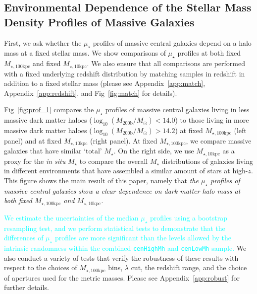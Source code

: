\documentclass[a4paper,fleqn,usenatbib]{mnras}
\def\rbcg{\texttt{cenHighMh}}
\def\nbcg{\texttt{cenLowMh}}
\def\mstar{{$M_{\star}$}}
\def\logmh{{$\log_{10} (M_{\mathrm{200b}}/M_{\odot})$}}
\def\minn{{$M_{\star,10\mathrm{kpc}}$}}
\def\mtot{{$M_{\star,100\mathrm{kpc}}$}}
\def\mden{{$\mu_{\star}$}}
\newcommand{\song}[1]{\textcolor{cyan}{#1}}
\begin{document}
\subsection{Environmental Dependence of the Stellar Mass Density Profiles of Massive 
            Galaxies}
    \label{ssec:sbp_mtot} 
       
    First, we ask whether the \mden{} profiles of massive central galaxies depend on 
   a halo mass at a fixed stellar mass.    
    We show comparisons of \mden{} profiles at both fixed \mtot{} and fixed 
    \minn{}. 
    We also ensure that all comparisons are performed with a fixed underlying redshift
    distribution by matching samples in redshift in addition to a fixed stellar mass
    (please see Appendix~\ref{app:match}, Appendix~\ref{app:redshift}, 
    and Fig~\ref{fig:match} for details). 
   
    Fig~\ref{fig:prof_1} compares the \mden{} profiles of massive central galaxies 
    living in less massive dark matter haloes (\logmh$<14.0$) to those living in more 
    massive dark matter haloes (\logmh$>14.2$) at fixed \mtot{} (left panel) and at 
    fixed \minn{} (right panel). 
    At fixed \mtot{}, we compare massive galaxies that have similar `total' \mstar{}. 
    On the right side, we use \minn{} as a proxy for the \textit{in situ} \mstar{} to 
    compare the overall \mstar{} distributions of galaxies living in different 
    environments that have assembled a similar amount of stars at high-$z$.
    This figure shows the main result of this paper, namely that 
    \emph{the \mden{} profiles of massive central galaxies show a clear dependence on 
    dark matter halo mass at both fixed \mtot{} and \minn{}.}

    \song{
    We estimate the uncertainties of the median \mden{} profiles using a bootstrap 
    resampling test, and we perform statistical tests to demonstrate that the 
    differences of \mden{} profiles are more significant than the levels allowed by 
    the intrinsic randomness within the combined \rbcg{} and \nbcg{} sample. 
    }
    We also conduct a variety of tests that verify the robustness of these results with
    respect to the choices of \mtot{} bins, $\lambda$ cut, the redshift range, and the 
    choice of apertures used for the metric masses. 
    Please see Appendix~\ref{app:robust} for further details.
   
\end{document}
